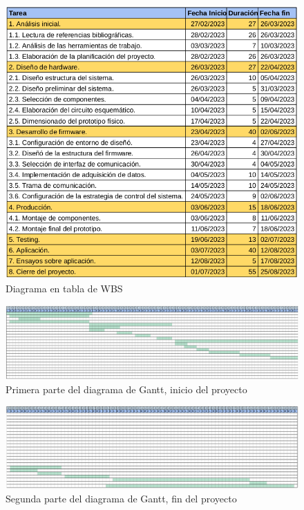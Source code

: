 \documentclass[
11pt, %
codirector, %
]{charter}
\begin{document}
\begin{figure}[htpb]
\centering 
\includegraphics[height=.5\textheight]{./Figuras/TABLA-GANTT.png}
\caption{Diagrama en tabla de WBS}
\label{fig:diagGantt}
\end{figure}

\begin{figure}[htpb]
\centering 
\includegraphics[angle=90, height=.95\textheight]{./Figuras/GANTT-primera.png}
\caption{Primera parte del diagrama de Gantt, inicio del proyecto}
\label{fig:diagGantt}
\end{figure}

\begin{figure}[htpb]
\centering 
\includegraphics[angle=90, height=.95\textheight]{./Figuras/GANTT-segunda.png}
\caption{Segunda parte del diagrama de Gantt, fin del proyecto}
\label{fig:diagGantt}
\end{figure}
\end{document}
